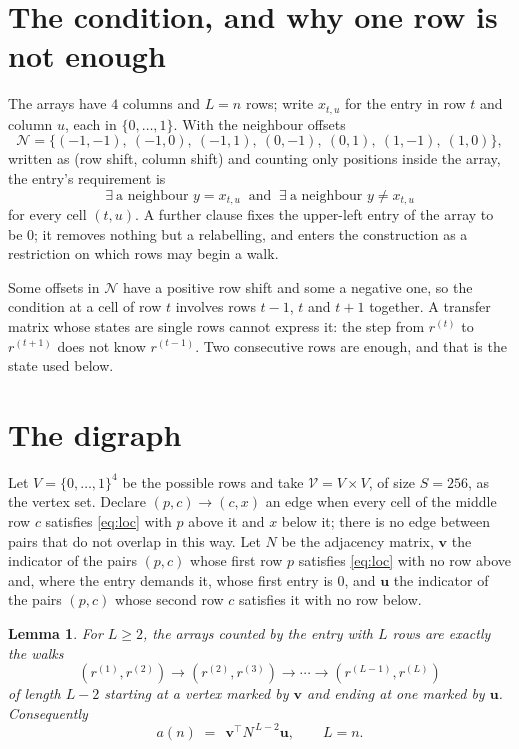 \documentclass[11pt,a4paper]{article}
\theoremstyle{plain}
\newtheorem{lemma}[theorem]{Lemma}
\theoremstyle{definition}
\begin{document}
\section{The condition, and why one row is not enough}

The arrays have $4$ columns and $L=n$ rows; write $x_{t,u}$ for the entry in
row $t$ and column $u$, each in $\{0,\dots,1\}$. With the neighbour offsets
\[
\mathcal N=\{(-1,-1),\ (-1,0),\ (-1,1),\ (0,-1),\ (0,1),\ (1,-1),\ (1,0)\},
\]
written as (row shift, column shift) and counting only positions inside the array, the
entry's requirement is
\begin{equation}\label{eq:loc}
\exists\ \text{a neighbour }y=x_{t,u}\ \text{ and }\ \exists\ \text{a neighbour }y\ne x_{t,u}
\end{equation}
for every cell $(t,u)$. A further clause fixes the upper-left entry of the array to be $0$; it removes nothing but a relabelling, and enters the construction as a restriction on which rows may begin a walk.

Some offsets in $\mathcal N$ have a positive row shift and some a negative one, so the
condition at a cell of row $t$ involves rows $t-1$, $t$ and $t+1$ together. A transfer
matrix whose states are single rows cannot express it: the step from $r^{(t)}$ to
$r^{(t+1)}$ does not know $r^{(t-1)}$. Two consecutive rows are enough, and that is
the state used below.

\section{The digraph}

Let $V=\{0,\dots,1\}^{4}$ be the possible rows and take
$\mathcal V=V\times V$, of size $S=256$, as the vertex set. Declare $(p,c)\to(c,x)$ an edge
when every cell of the middle row $c$ satisfies \eqref{eq:loc} with $p$ above it and $x$
below it; there is no edge between pairs that do not overlap in this way. Let $N$ be the
adjacency matrix, $\mathbf{v}$ the indicator of the pairs $(p,c)$ whose first row $p$
satisfies \eqref{eq:loc} with no row above and, where the entry demands it, whose first entry is $0$, and $\mathbf{u}$ the indicator of
the pairs $(p,c)$ whose second row $c$ satisfies it with no row below.

\begin{lemma}\label{lem:walk}
For $L\ge2$, the arrays counted by the entry with $L$ rows are exactly the walks
\[
(r^{(1)},r^{(2)})\to(r^{(2)},r^{(3)})\to\cdots\to(r^{(L-1)},r^{(L)})
\]
of length $L-2$ starting at a vertex marked by $\mathbf{v}$ and ending at one marked by
$\mathbf{u}$. Consequently
\[
a(n)\;=\;\,\mathbf{v}^{\!\top}N^{\,L-2}\mathbf{u},\qquad L=n .
\]
\end{lemma}
\end{document}
